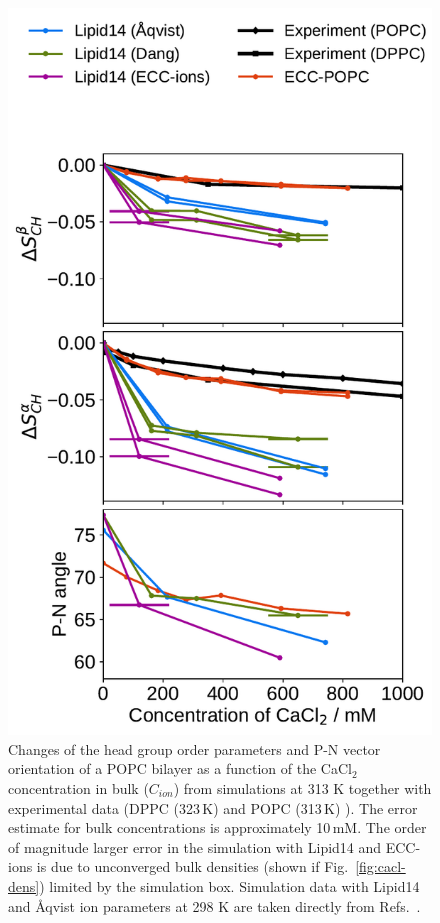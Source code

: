 \begin{figure}[tbp!] 
  \centering 
  \includegraphics[width=\figwidth]{../img/ecc_popc/OrdPars-A-B-PNvec_L14-ECC-lipids_CaCl.pdf}
  \caption{\label{fig:delta_ordPar_CaCl} 
    Changes of the head group order parameters and P-N vector orientation of a POPC bilayer  
    as a function of the CaCl$_2$ concentration in bulk ($C_{ion}$) 
    from simulations at 313 K together with experimental data  
    (DPPC (323\,K) \citep{akutsu81} and POPC (313\,K) \citep{altenbach84}).  
    The error estimate for bulk concentrations is approximately 10\,mM. 
    The order of magnitude larger error in the
    simulation with Lipid14 and ECC-ions is due to unconverged bulk densities  (shown if Fig.~\ref{fig:cacl-dens}) limited by
    the simulation box.  
    Simulation data with Lipid14 and Åqvist ion parameters at 298 K are taken directly from 
    Refs.~\citep{lipid14POPC0mMNaClfiles,lipid14POPC350mMCaClfiles,lipid14POPC350mMCaClfilesNC}. 
  } 
\end{figure} 


